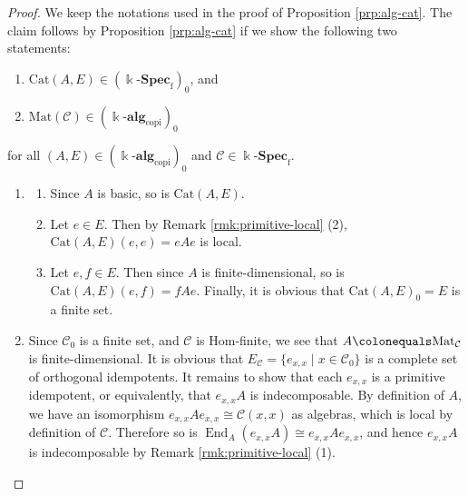 \documentclass{surv-l}
\numberwithin{equation}{chapter}
\numberwithin{figure}{chapter}
\theoremstyle{plain}
\theoremstyle{definition}
\theoremstyle{remark}
\DeclareMathOperator{\End}{End}
\begin{document}
\begin{proof}
We keep the notations used in the proof of Proposition \ref{prp:alg-cat}.
The claim follows by Proposition \ref{prp:alg-cat} if we show the
following two statements:
\begin{enumerate}
 \item
$\mathrm{Cat}(A, E) \in (\Bbbk\text{-}\mathbf{Spec}_{\mathrm{f}})_0$, and
\item
$\mathrm{Mat}({\mathcal{C}}) \in (\Bbbk\text{-}\mathbf{alg}_{\mathrm{copi}})_0$
\end{enumerate}
for all $(A, E) \in (\Bbbk\text{-}\mathbf{alg}_{\mathrm{copi}})_0$ and ${\mathcal{C}} \in \Bbbk\text{-}\mathbf{Spec}_{\mathrm{f}}$.
\begin{enumerate}[wide]
\item 
\begin{enumerate}[wide, label=(\alph*)]
\item Since $A$ is basic, so is $\mathrm{Cat}(A, E)$.
\item Let $e \in E$.  Then by Remark \ref{rmk:primitive-local} (2),
$\mathrm{Cat}(A, E)(e, e) = eAe$ is local.
\item Let $e, f \in E$.  Then since $A$ is finite-dimensional,
so is $\mathrm{Cat}(A, E)(e, f) = fAe$.
Finally, it is obvious that
$\mathrm{Cat}(A, E)_0 = E$ is a finite set.
\end{enumerate}
\item Since ${\mathcal{C}}_0$ is a finite set, and ${\mathcal{C}}$ is Hom-finite, we see that
$A\colonequals  \mathrm{Mat}_{\mathcal{C}}$ is finite-dimensional.
It is obvious that $E_{\mathcal{C}} = \{e_{x,x} \mid x \in {\mathcal{C}}_0\}$ is a complete set of
orthogonal idempotents.
It remains to show that each $e_{x,x}$ is a primitive idempotent,
or equivalently, that $e_{x,x}A$ is indecomposable.
By definition of $A$, we have an isomorphism $e_{x,x}Ae_{x,x} \cong {\mathcal{C}}(x, x)$
as algebras, which is local by definition of ${\mathcal{C}}$.
Therefore so is $\End_A(e_{x,x}A) \cong e_{x,x}Ae_{x,x}$, and hence
$e_{x,x}A$ is indecomposable by Remark \ref{rmk:primitive-local} (1).
\end{enumerate}
\end{proof}
\end{document}
